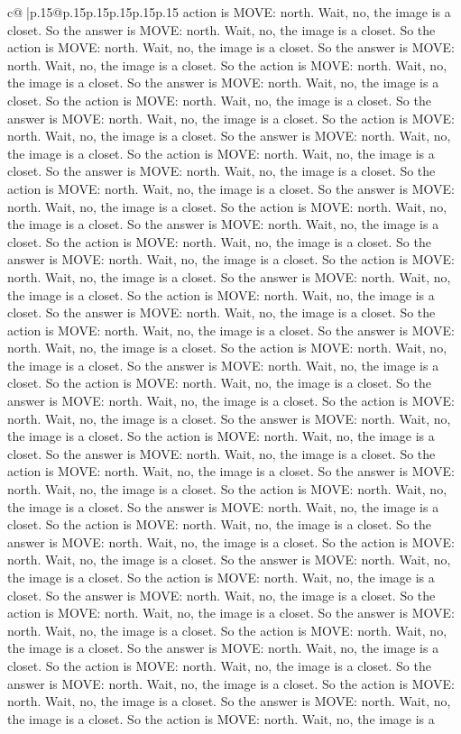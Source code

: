 \documentclass{article}
\begin{document}
{\begin{supertabular}{c@{$\;$}|p{.15\linewidth}@{}p{.15\linewidth}p{.15\linewidth}p{.15\linewidth}p{.15\linewidth}p{.15\linewidth}}
{{{action is MOVE: north. Wait, no, the image is a closet. So the answer is MOVE: north. Wait, no, the image is a closet. So the action is MOVE: north. Wait, no, the image is a closet. So the answer is MOVE: north. Wait, no, the image is a closet. So the action is MOVE: north. Wait, no, the image is a closet. So the answer is MOVE: north. Wait, no, the image is a closet. So the action is MOVE: north. Wait, no, the image is a closet. So the answer is MOVE: north. Wait, no, the image is a closet. So the action is MOVE: north. Wait, no, the image is a closet. So the answer is MOVE: north. Wait, no, the image is a closet. So the action is MOVE: north. Wait, no, the image is a closet. So the answer is MOVE: north. Wait, no, the image is a closet. So the action is MOVE: north. Wait, no, the image is a closet. So the answer is MOVE: north. Wait, no, the image is a closet. So the action is MOVE: north. Wait, no, the image is a closet. So the answer is MOVE: north. Wait, no, the image is a closet. So the action is MOVE: north. Wait, no, the image is a closet. So the answer is MOVE: north. Wait, no, the image is a closet. So the action is MOVE: north. Wait, no, the image is a closet. So the answer is MOVE: north. Wait, no, the image is a closet. So the action is MOVE: north. Wait, no, the image is a closet. So the answer is MOVE: north. Wait, no, the image is a closet. So the action is MOVE: north. Wait, no, the image is a closet. So the answer is MOVE: north. Wait, no, the image is a closet. So the action is MOVE: north. Wait, no, the image is a closet. So the answer is MOVE: north. Wait, no, the image is a closet. So the action is MOVE: north. Wait, no, the image is a closet. So the answer is MOVE: north. Wait, no, the image is a closet. So the action is MOVE: north. Wait, no, the image is a closet. So the answer is MOVE: north. Wait, no, the image is a closet. So the action is MOVE: north. Wait, no, the image is a closet. So the answer is MOVE: north. Wait, no, the image is a closet. So the action is MOVE: north. Wait, no, the image is a closet. So the answer is MOVE: north. Wait, no, the image is a closet. So the action is MOVE: north. Wait, no, the image is a closet. So the answer is MOVE: north. Wait, no, the image is a closet. So the action is MOVE: north. Wait, no, the image is a closet. So the answer is MOVE: north. Wait, no, the image is a closet. So the action is MOVE: north. Wait, no, the image is a closet. So the answer is MOVE: north. Wait, no, the image is a closet. So the action is MOVE: north. Wait, no, the image is a closet. So the answer is MOVE: north. Wait, no, the image is a closet. So the action is MOVE: north. Wait, no, the image is a closet. So the answer is MOVE: north. Wait, no, the image is a closet. So the action is MOVE: north. Wait, no, the image is a closet. So the answer is MOVE: north. Wait, no, the image is a closet. So the action is MOVE: north. Wait, no, the image is a closet. So the answer is MOVE: north. Wait, no, the image is a closet. So the action is MOVE: north. Wait, no, the image is a closet. So the answer is MOVE: north. Wait, no, the image is a closet. So the action is MOVE: north. Wait, no, the image is a }}}
\end{supertabular}}
\end{document}
